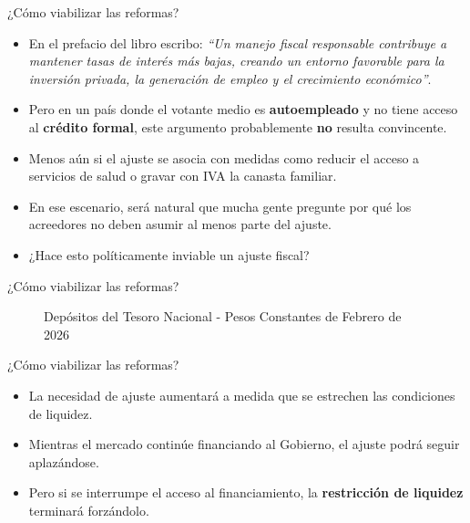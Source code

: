 \begin{frame}{¿Cómo viabilizar las reformas?}
\begin{itemize}
    \item En el prefacio del libro escribo: \textit{``Un manejo fiscal responsable contribuye a mantener tasas de interés más bajas, creando un entorno favorable para la inversión privada, la generación de empleo y el crecimiento económico''}.
    \item Pero en un país donde el votante medio es \textbf{autoempleado} y no tiene acceso al \textbf{crédito formal}, este argumento probablemente \textbf{no} resulta convincente.
    \item Menos aún si el ajuste se asocia con medidas como reducir el acceso a servicios de salud o gravar con IVA la canasta familiar.
    \item En ese escenario, será natural que mucha gente pregunte por qué los acreedores no deben asumir al menos parte del ajuste.
    \item ¿Hace esto políticamente inviable un ajuste fiscal?
\end{itemize}
\end{frame}


\begin{frame}{¿Cómo viabilizar las reformas?}
    \begin{figure}
        \centering
        
        \caption{Depósitos del Tesoro Nacional - Pesos Constantes de Febrero de 2026}
        \label{fig:despositos}
    \end{figure}
\end{frame}


\begin{frame}{¿Cómo viabilizar las reformas?}
    \begin{itemize}
        \item La necesidad de ajuste aumentará a medida que se estrechen las condiciones de liquidez.
        \item Mientras el mercado continúe financiando al Gobierno, el ajuste podrá seguir aplazándose.
        \item Pero si se interrumpe el acceso al financiamiento, la \textbf{restricción de liquidez} terminará forzándolo.
    \end{itemize}
\end{frame}

